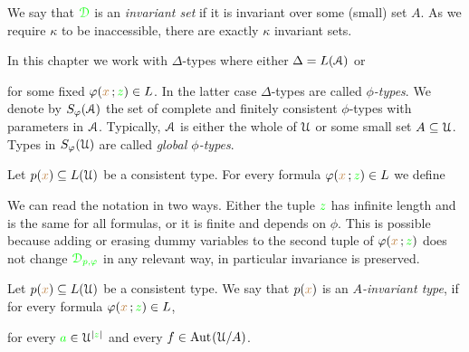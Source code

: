 \documentclass[creche.tex]{subfiles}
\begin{document}
We say that ${\color{green}\EuScript D}$ is an \emph{invariant set\/} if it is invariant over some (small) set $A$.
As we require $\kappa$ to be inaccessible, there are exactly $\kappa$ invariant sets.

In this chapter we work with $\Delta$-types where either  $\Delta=L(\EuScript A)$ or 


for some fixed $\varphi({\color{brown} x}\,;{\color{green} z})\in L$.
In the latter case  $\Delta$-types are called \emph{$\phi$-types}.
We denote by \emph{$S_{\varphi}(\EuScript A)$\/} the set of complete and finitely consistent $\phi$-types with parameters in $\EuScript A$.
Typically, $\EuScript A$ is either the whole of $\EuScript U$ or some small set $A\subseteq\EuScript U$.
Types in \emph{$S_{\varphi}(\EuScript U)$\/} are called \emph{global $\phi$-types}.

% 



Let $p({\color{brown} x})\subseteq L(\EuScript U)$ be a consistent type.
For every formula $\varphi({\color{brown} x}\,;{\color{green} z})\in L$ we define


We can read the notation in two ways.
Either the tuple ${\color{green} z}$ has infinite length and is the same for all formulas, or it is finite and depends on $\phi$.
This is possible because adding or erasing dummy variables to the second tuple of $\varphi({\color{brown} x}\,;{\color{green} z})$ does not change ${\color{green}\EuScript D_{p,\varphi}}$ in any relevant way, in particular invariance is preserved.

Let $p({\color{brown} x})\subseteq L(\EuScript U)$ be a consistent type.
We say that $p({\color{brown} x})$ is an \emph{$A$-invariant type\/}, if for every formula $\varphi({\color{brown} x}\,;{\color{green} z})\in L$, 

\hfill for every ${\color{green} a}\in\EuScript U^{|{\color{green} z}|}$ and every $f\in\textrm{Aut\kern.15ex}(\EuScript U/A)$.
\end{document}
